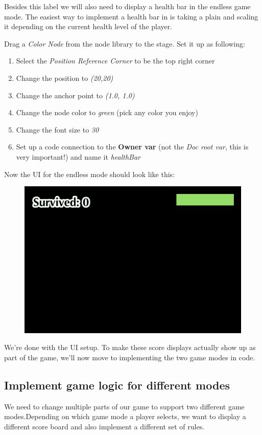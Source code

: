 Besides this label we will also need to display a health bar in the endless game
mode. The easiest way to implement a health bar in \cocos{} is taking a plain
 and scaling it depending on the current health level
of the player.

\begin{leftbar}
Drag a \textit{Color Node} from the node library to the stage. Set it up as
following:
\begin{enumerate}
  \item Select the \textit{Position Reference Corner} to be the top right corner
  \item Change the position to \textit{(20,20)}
  \item Change the anchor point to \textit{(1.0, 1.0)}
  \item Change the node color to \textit{green} (pick any color you enjoy)
  \item Change the font size to \textit{30}
  \item Set up a code connection to the \textbf{Owner var} (not the \textit{Doc
  root var}, this is very important!) and name it \textit{healthBar}
\end{enumerate}
\end{leftbar}

Now the UI for the endless mode should look like this:

\begin{figure}[H]
    \centering
    \includegraphics[width=0.5\linewidth]{images/Chapter7/endless_mode_ui.png}
\end{figure}

We're done with the UI setup. To make these score displays actually show up as
part of the game, we'll now move to implementing the two game modes in code.

\subsection{Implement game logic for different modes}
We need to change multiple parts of our game to support two different game
modes.Depending on which game mode a player selects, we want to display a different
score board and also implement a different set of rules.

